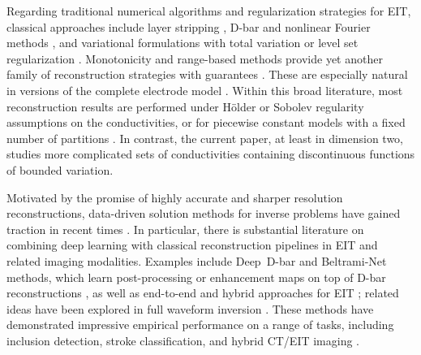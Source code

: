 \documentclass[pdflatex,sn-mathphys-num]{sn-jnl-preprint}
\theoremstyle{thmstyleone}%
\theoremstyle{thmstyletwo}%
\theoremstyle{thmstylethree}%
\numberwithin{equation}{section}
\numberwithin{theorem}{section}
\begin{document}
Regarding traditional numerical algorithms and regularization strategies for EIT, classical approaches include layer stripping \cite{somersalo1991layer}, D-bar and nonlinear Fourier methods \cite{knudsen2007d,knudsen2009regularized,mueller2003direct,astala2010numerical,astala2014nonlinear,mueller2020d,isaacson2021d,lytle2020nachman}, and variational formulations with total variation or level set regularization \cite{chung2005electrical,tanushev2007piecewise,jin2012analysis,rondi2008regularization}. Monotonicity and range-based methods provide yet another family of reconstruction strategies with guarantees \cite{garde2017convergence,sun2025learned}. These are especially natural in versions of the complete electrode model \cite{stuart2016bayesian,garde2021mimicking,garde2022series,harrach2019uniqueness}. Within this broad literature, most reconstruction results are performed under H\"older or Sobolev regularity assumptions on the conductivities, or for piecewise constant models with a fixed number of partitions \cite{faraco2018characterization,barcelo2001stability,clop2010stability}. In contrast, the current paper, at least in dimension two, studies more complicated sets of conductivities containing discontinuous functions of bounded variation.

Motivated by the promise of highly accurate and sharper resolution reconstructions, data-driven solution methods for inverse problems have gained traction in recent times \cite{arridge2019solving,ghattas2021learning,ongie2020deep}. In particular, there is substantial literature on combining deep learning with classical reconstruction pipelines in EIT and related imaging modalities. Examples include Deep~D-bar and Beltrami-Net methods, which learn post-processing or enhancement maps on top of D-bar reconstructions \cite{hamilton2018deep,hamilton2019beltrami,hamilton2016hybrid,siltanen2020electrical}, as well as end-to-end and hybrid approaches for EIT \cite{colibazzi2022learning,tanyu2023electrical,agnelli2020classification,beretta2025discrete,alsaker2024ct}; related ideas have been explored in full waveform inversion \cite{ding2022coupling}. These methods have demonstrated impressive empirical performance on a range of tasks, including inclusion detection, stroke classification, and hybrid CT/EIT imaging \cite{sun2025learned,agnelli2025stroke,tanyu2023electrical}. 
\end{document}
